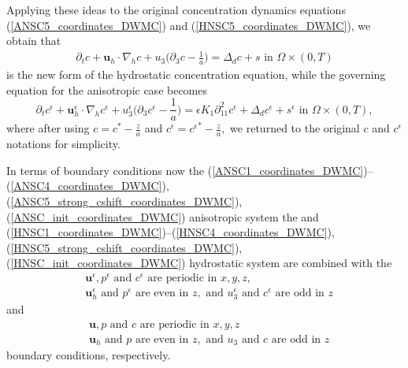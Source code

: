 \documentclass[12pt]{report}
\numberwithin{theorem}{chapter}
\numberwithin{corollary}{chapter}
\numberwithin{lemma}{chapter}
\numberwithin{remark}{chapter}
\numberwithin{definition}{chapter}
\numberwithin{prop}{chapter}
\begin{document}
Applying these ideas to the original concentration dynamics equations (\ref{ANSC5_coordinates_DWMC}) and (\ref{HNSC5_coordinates_DWMC}), we obtain that
%
\begin{equation} \label{HNSC5_strong_cshift_coordinates_DWMC}
  \begin{split}
    \partial_t c + \mathbf{u}_h \cdot \nabla_h c + u_3 \bigg ( \partial_3 c - \frac{1}{a} \bigg ) = \Delta_d c + s \text{ in } \Omega \times (0,T)
  \end{split}
\end{equation}
%
is the new form of the hydrostatic concentration equation, while the governing equation for the anisotropic case becomes
%
\begin{equation} \label{ANSC5_strong_cshift_coordinates_DWMC}
    \partial_t c^\epsilon + \mathbf{u}_h^\epsilon \cdot \nabla_h c^\epsilon + u_3^\epsilon \bigg ( \partial_3 c^\epsilon - \frac{1}{a} \bigg )= \epsilon K_1 \partial_{11} ^ 2 c^\epsilon + \Delta_d c^\epsilon + s^\epsilon \text{ in } \Omega \times (0,T),
\end{equation}
%
where after using $c = c^* - \frac{z}{a}$ and $c^\epsilon = {c^\epsilon}^* - \frac{z}{a},$ we returned to the original $c$ and $c^\epsilon$ notations for simplicity.

In terms of boundary conditions now the (\ref{ANSC1_coordinates_DWMC})--(\ref{ANSC4_coordinates_DWMC}), (\ref{ANSC5_strong_cshift_coordinates_DWMC}), (\ref{ANSC_init_coordinates_DWMC}) anisotropic system the and (\ref{HNSC1_coordinates_DWMC})--(\ref{HNSC4_coordinates_DWMC}), (\ref{HNSC5_strong_cshift_coordinates_DWMC}), (\ref{HNSC_init_coordinates_DWMC}) hydrostatic system are combined with the
%
\begin{equation} \label{ANSC_bc-strong_coordinates_DWMC}
  \begin{split}
    & \mathbf{u}^\epsilon, p^\epsilon \text{ and } c^\epsilon \text{ are periodic in } x,y,z, \\
    & \mathbf{u}_h^\epsilon \text{ and } p^\epsilon \text{ are even in $z$}, \text{ and } u_3^\epsilon \text{ and } c^\epsilon \text{ are odd in $z$}
  \end{split}
\end{equation}
%
and
%
\begin{equation} \label{HNSC_bc-strong_coordinates_DWMC}
  \begin{split}
    & \mathbf{u}, p \text{ and } c \text{ are periodic in } x,y,z \\
    & \mathbf{u}_h \text{ and } p \text{ are even in $z$}, \text{ and } u_3 \text{ and } c \text{ are odd in $z$}
  \end{split}
\end{equation}
%
boundary conditions, respectively.
\end{document}

